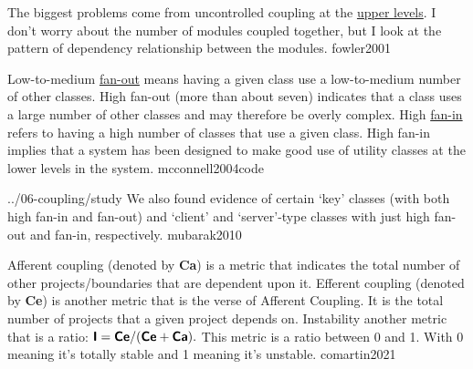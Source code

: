 \documentclass{article}
\begin{document}
  {The biggest problems come from uncontrolled coupling at the \ul{upper levels}. I don't worry about the number of modules coupled together, but I look at the pattern of dependency relationship between the modules.}
  {fowler2001}

  {Low-to-medium \ul{fan-out} means having a given class use a low-to-medium number of other classes. High fan-out (more than about seven) indicates that a class uses a large number of other classes and may therefore be overly complex. High \ul{fan-in} refers to having a high number of classes that use a given class. High fan-in implies that a system has been designed to make good use of utility classes at the lower levels in the system.}
  {mcconnell2004code}



\qte
  {../06-coupling/study}
  {We also found evidence of certain `key' classes (with both high fan-in and fan-out) and `client' and `server'-type classes with just high fan-out and fan-in, respectively.}
  {mubarak2010}


  {Afferent coupling (denoted by \textbf{\textsf{Ca}}) is a metric that indicates the total number of other projects/boundaries that are dependent upon it. Efferent coupling (denoted by \textbf{\textsf{Ce}}) is another metric that is the verse of Afferent Coupling. It is the total number of projects that a given project depends on. Instability another metric that is a ratio: $\textbf{\textsf{I}} = \textbf{\textsf{Ce}} / (\textbf{\textsf{Ce}} + \textbf{\textsf{Ca}}).$ This metric is a ratio between 0 and 1. With 0 meaning it's totally stable and 1 meaning it's unstable.}
  {comartin2021}
\end{document}
